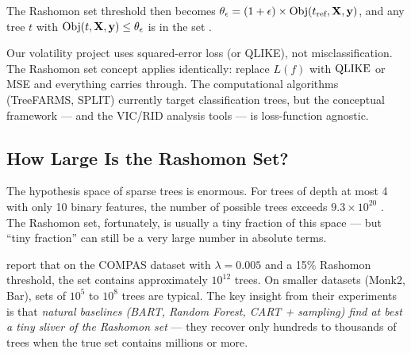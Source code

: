 The Rashomon set threshold then becomes $\theta_\epsilon = (1 + \epsilon)
\times \operatorname{Obj}(t_{\text{ref}}, \mathbf{X}, \mathbf{y})$, and any tree $t$ with
$\operatorname{Obj}(t, \mathbf{X}, \mathbf{y}) \leq \theta_\epsilon$ is in the set
\citep{XinEtAl2022}.

\begin{projectconnection}
Our volatility project uses squared-error loss (or QLIKE), not
misclassification.  The Rashomon set concept applies identically: replace
$L(f)$ with $\operatorname{QLIKE}$ or MSE and everything carries through.  The
computational algorithms (TreeFARMS, SPLIT) currently target classification
trees, but the conceptual framework --- and the VIC/RID analysis tools --- is
loss-function agnostic.
\end{projectconnection}

\subsection{How Large Is the Rashomon Set?}

The hypothesis space of sparse trees is enormous.  For trees of depth at most
4 with only 10 binary features, the number of possible trees exceeds
$9.3 \times 10^{20}$ \citep{XinEtAl2022}.  The Rashomon set, fortunately, is
usually a tiny fraction of this space --- but ``tiny fraction'' can still be
a very large number in absolute terms.

\citet{XinEtAl2022} report that on the COMPAS dataset with
$\lambda = 0.005$ and a 15\% Rashomon threshold, the set contains
approximately $10^{12}$ trees.  On smaller datasets (Monk2, Bar), sets of
$10^5$ to $10^8$ trees are typical.  The key insight from their experiments
is that \emph{natural baselines (BART, Random Forest, CART + sampling) find
at best a tiny sliver of the Rashomon set} --- they recover only hundreds to
thousands of trees when the true set contains millions or more.

